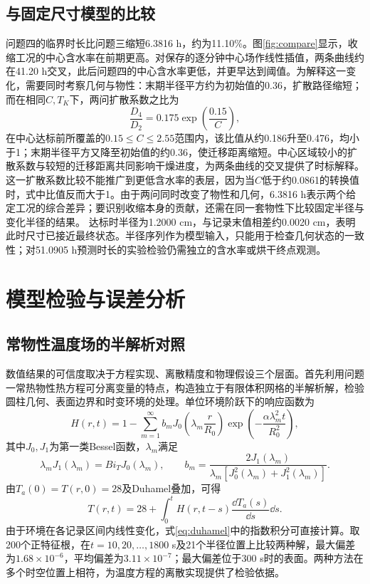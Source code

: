 \subsection{与固定尺寸模型的比较}
问题四的临界时长比问题三缩短6.3816 h，约为11.10\%。图\ref{fig:compare}显示，收缩工况的中心含水率在前期更高。对保存的逐分钟中心场作线性插值，两条曲线约在41.20 h交叉，此后问题四的中心含水率更低，并更早达到阈值。为解释这一变化，需要同时考察几何与物性：末期半径平方约为初始值的0.36，扩散路径缩短；而在相同$C,T_K$下，两问扩散系数之比为
\begin{equation}
\frac{D_4}{D_2}=0.175\exp\left(\frac{0.15}{C}\right),
\end{equation}
在中心达标前所覆盖的$0.15\le C\le2.55$范围内，该比值从约0.186升至0.476，均小于1；末期半径平方又降至初始值的约0.36，使迁移距离缩短。中心区域较小的扩散系数与较短的迁移距离共同影响干燥进度，为两条曲线的交叉提供了时标解释。这一扩散系数比较不能推广到更低含水率的表层，因为当$C$低于约0.0861的转换值时，式中比值反而大于1。由于两问同时改变了物性和几何，6.3816 h表示两个给定工况的综合差异；要识别收缩本身的贡献，还需在同一套物性下比较固定半径与变化半径的结果。
达标时半径为1.2000 cm，与记录末值相差约0.0020 cm，表明此时尺寸已接近最终状态。半径序列作为模型输入，只能用于检查几何状态的一致性；对51.0905 h预测时长的实验检验仍需独立的含水率或烘干终点观测。
\FloatBarrier

\section{模型检验与误差分析}
\label{sec:verification}
\subsection{常物性温度场的半解析对照}
数值结果的可信度取决于方程实现、离散精度和物理假设三个层面。首先利用问题一常热物性热方程可分离变量的特点，构造独立于有限体积网格的半解析解，检验圆柱几何、表面边界和时变环境的处理。单位环境阶跃下的响应函数为
\begin{equation}
H(r,t)=1-\sum_{m=1}^{\infty}b_mJ_0\left(\lambda_m\frac r{R_0}\right)
\exp\left(-\frac{\alpha\lambda_m^2t}{R_0^2}\right),
\end{equation}
其中$J_0,J_1$为第一类Bessel函数，$\lambda_m$满足
\begin{equation}
\lambda_mJ_1(\lambda_m)=Bi_TJ_0(\lambda_m),\qquad
b_m=\frac{2J_1(\lambda_m)}{\lambda_m[J_0^2(\lambda_m)+J_1^2(\lambda_m)]}.
\end{equation}
由$T_a(0)=T(r,0)=28$及Duhamel叠加，可得
\begin{equation}
T(r,t)=28+\int_0^t H(r,t-s)\frac{\dd T_a(s)}{\dd s}\dd s.
\label{eq:duhamel}
\end{equation}
由于环境在各记录区间内线性变化，式\eqref{eq:duhamel}中的指数积分可直接计算。取200个正特征根，在$t=10,20,\ldots,1800$ s及21个半径位置上比较两种解，最大偏差为$1.68\times10^{-6}$\tempunit，平均偏差为$3.11\times10^{-7}$\tempunit；最大偏差位于300 s时的表面。两种方法在多个时空位置上相符，为温度方程的离散实现提供了检验依据。

